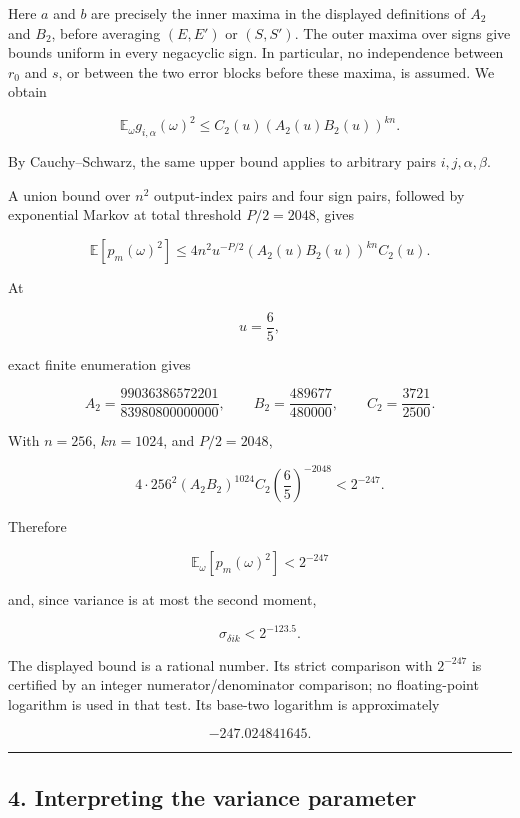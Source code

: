\documentclass[11pt,a4paper]{article}
\begin{document}
Here \(a\) and \(b\) are precisely the inner maxima in the displayed definitions of \(A_2\) and \(B_2\), before averaging \((E,E')\) or \((S,S')\). The outer maxima over signs give bounds uniform in every negacyclic sign. In particular, no independence between \(r_0\) and \(s\), or between the two error blocks before these maxima, is assumed. We obtain

\[
\mathbb E_\omega g_{i,\alpha}(\omega)^2
\le C_2(u)(A_2(u)B_2(u))^{kn}.
\]

By Cauchy--Schwarz, the same upper bound applies to arbitrary pairs \(i,j,\alpha,\beta\).

A union bound over \(n^2\) output-index pairs and four sign pairs, followed by exponential Markov at total threshold \(P/2=2048\), gives

\[
\boxed{
\mathbb E[p_m(\omega)^2]
\le
4n^2u^{-P/2}
(A_2(u)B_2(u))^{kn}C_2(u)
}.
\]

At

\[
u=\frac65,
\]

exact finite enumeration gives

\[
A_2=
\frac{99036386572201}{83980800000000},
\qquad
B_2=
\frac{489677}{480000},
\qquad
C_2=
\frac{3721}{2500}.
\]

With \(n=256\), \(kn=1024\), and \(P/2=2048\),

\[
4\cdot256^2
(A_2B_2)^{1024}
C_2
\left(\frac65\right)^{-2048}
<2^{-247}.
\]

Therefore

\[
\boxed{
\mathbb E_\omega[p_m(\omega)^2]<2^{-247}
}
\]

and, since variance is at most the second moment,

\[
\boxed{
\sigma_{\delta ik}<2^{-123.5}.
}
\]

The displayed bound is a rational number. Its strict comparison with \(2^{-247}\) is certified by an integer numerator/denominator comparison; no floating-point logarithm is used in that test. Its base-two logarithm is approximately

\[
-247.024841645.
\]

\begin{center}\rule{0.5\linewidth}{0.5pt}\end{center}

\subsection{4. Interpreting the variance parameter}\label{interpreting-the-variance-parameter}
\end{document}
